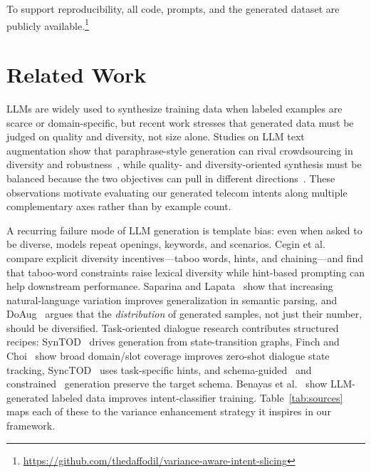 \documentclass[conference]{IEEEtran}
\begin{document}
To support reproducibility, all code, prompts, and the generated dataset are publicly available.\footnote{\url{https://github.com/thedaffodil/variance-aware-intent-slicing}}

\section{Related Work}
\label{sec:related}

LLMs are widely used to synthesize training data when labeled examples are scarce or domain-specific, but recent work stresses that generated data must be judged on quality and diversity, not size alone. Studies on LLM text augmentation show that paraphrase-style generation can rival crowdsourcing in diversity and robustness~\cite{cegin2023chatgpt,dai2023auggpt}, while quality- and diversity-oriented synthesis must be balanced because the two objectives can pull in different directions~\cite{bao2025qualitydiversity}. These observations motivate evaluating our generated telecom intents along multiple complementary axes rather than by example count.

A recurring failure mode of LLM generation is template bias: even when asked to be diverse, models repeat openings, keywords, and scenarios. Cegin et al.~\cite{cegin2024diversity} compare explicit diversity incentives---taboo words, hints, and chaining---and find that taboo-word constraints raise lexical diversity while hint-based prompting can help downstream performance. Saparina and Lapata~\cite{saparina2024nlvariation} show that increasing natural-language variation improves generalization in semantic parsing, and DoAug~\cite{wang2025doaug} argues that the \emph{distribution} of generated samples, not just their number, should be diversified. Task-oriented dialogue research contributes structured recipes: SynTOD~\cite{samarinas2024syntod} drives generation from state-transition graphs, Finch and Choi~\cite{finch2024diversedst} show broad domain/slot coverage improves zero-shot dialogue state tracking, SyncTOD~\cite{saley2024synctod} uses task-specific hints, and schema-guided~\cite{kulkarni2024synthdst} and constrained~\cite{shin2021constrained} generation preserve the target schema. Benayas et al.~\cite{benayas2024intent} show LLM-generated labeled data improves intent-classifier training. Table~\ref{tab:sources} maps each of these to the variance enhancement strategy it inspires in our framework.
\end{document}
